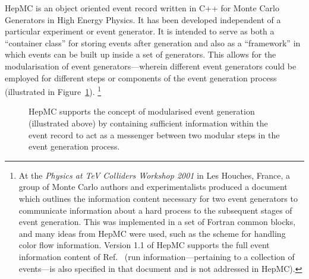 \documentclass[11pt,letterpaper]{article}
\begin{document}
HepMC is an object oriented event record written in C++ for Monte
Carlo Generators in High Energy Physics. It has been developed
independent of a particular experiment or event generator.  It is
intended to serve as both a ``container class'' for storing events after
generation and also as a ``framework'' in which events can be built up
inside a set of generators. This allows for the modularisation of
event generators---wherein different event generators could be
employed for different steps or components of the event generation
process (illustrated in Figure~\ref{modularisation}).
\footnote{
%
At the {\it Physics at TeV Colliders Workshop 2001} in Les
Houches, France, a group of Monte Carlo authors and experimentalists
produced a document~\cite{Boos:2001cv} which outlines the information
content necessary for two event generators to communicate information
about a hard process to the subsequent stages of event
generation. This was implemented in a set of Fortran common blocks,
and many ideas from HepMC were used, such as the scheme for handling
color flow information. Version 1.1 of HepMC supports the full event
information content of Ref.~\cite{Boos:2001cv} (run
information---pertaining to a collection of events---is also specified
in that document and is not addressed in HepMC).  }

\begin{figure}[h]
  \begin{center}
    \end{center}
  \caption{\label{modularisation} 
    HepMC supports the concept of modularised event generation
    (illustrated above) by containing sufficient information within the
    event record to act as a messenger between two modular steps in
    the event generation process.  }
\end{figure}
\end{document}
